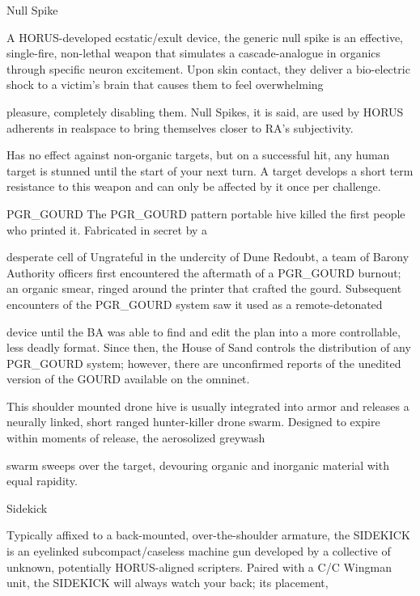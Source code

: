 Null Spike  

A HORUS-developed ecstatic/exult device, the generic null spike is an effective, single-fire, non-lethal  
weapon that simulates a cascade-analogue in organics through specific neuron excitement. Upon skin  
contact, they deliver a bio-electric shock to a victim’s brain that causes them to feel overwhelming  

pleasure, completely disabling them. Null Spikes, it is said, are used by HORUS adherents in realspace to  
bring themselves closer to RA’s subjectivity. 
 

                                                                                                             


Has no effect against non-organic targets, but on a successful hit, any human target is stunned until the  
start of your next turn. A target develops a short term resistance to this weapon and can only be affected  
by it once per challenge.
 

PGR\_GOURD  
The PGR\_GOURD pattern portable hive killed the first people who printed it. Fabricated in secret by a  

desperate cell of Ungrateful in the undercity of Dune Redoubt, a team of Barony Authority officers first  
encountered the aftermath of a PGR\_GOURD burnout; an organic smear, ringed around the printer that  
crafted the gourd. Subsequent encounters of the PGR\_GOURD system saw it used as a remote-detonated  

device until the BA was able to find and edit the plan into a more controllable, less deadly format. Since  
then, the House of Sand controls the distribution of any PGR\_GOURD system; however, there are  
unconfirmed reports of the unedited version of the GOURD available on the omninet.   

This shoulder mounted drone hive is usually integrated into armor and releases a neurally linked, short  
ranged hunter-killer drone swarm. Designed to expire within moments of release, the aerosolized greywash  

swarm sweeps over the target, devouring organic and inorganic material with equal rapidity. 
 

Sidekick  

Typically affixed to a back-mounted, over-the-shoulder armature, the SIDEKICK is an eyelinked  
subcompact/caseless machine gun developed by a collective of unknown, potentially HORUS-aligned  
scripters. Paired with a C/C Wingman unit, the SIDEKICK will always watch your back; its placement,  

